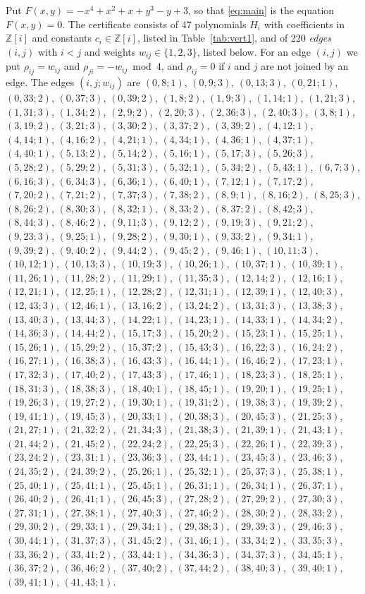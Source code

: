 \documentclass[11pt]{article}
\newcommand{\Z}{\mathbb{Z}}
\begin{document}
Put $F(x,y)=-x^{4}+x^{2}+x+y^{3}-y+3$, so that \eqref{eq:main} is the equation $F(x,y)=0$. The certificate consists of 47 polynomials $H_i$ with coefficients in $\Z[i]$ and constants $c_i\in\Z[i]$, listed in Table~\ref{tab:vert1}, and of 220 \emph{edges} $(i,j)$ with $i<j$ and weights $w_{ij}\in\{1,2,3\}$, listed below. For an edge $(i,j)$ we put $\rho_{ij}=w_{ij}$ and $\rho_{ji}=-w_{ij}\bmod 4$, and $\rho_{ij}=0$ if $i$ and $j$ are not joined by an edge.
The edges $(i,j;w_{ij})$ are $(0,8;1)$, $(0,9;3)$, $(0,13;3)$, $(0,21;1)$, $(0,33;2)$, $(0,37;3)$, $(0,39;2)$, $(1,8;2)$, $(1,9;3)$, $(1,14;1)$, $(1,21;3)$, $(1,31;3)$, $(1,34;2)$, $(2,9;2)$, $(2,20;3)$, $(2,36;3)$, $(2,40;3)$, $(3,8;1)$, $(3,19;2)$, $(3,21;3)$, $(3,30;2)$, $(3,37;2)$, $(3,39;2)$, $(4,12;1)$, $(4,14;1)$, $(4,16;2)$, $(4,21;1)$, $(4,34;1)$, $(4,36;1)$, $(4,37;1)$, $(4,40;1)$, $(5,13;2)$, $(5,14;2)$, $(5,16;1)$, $(5,17;3)$, $(5,26;3)$, $(5,28;2)$, $(5,29;2)$, $(5,31;3)$, $(5,32;1)$, $(5,34;2)$, $(5,43;1)$, $(6,7;3)$, $(6,16;3)$, $(6,34;3)$, $(6,36;1)$, $(6,40;1)$, $(7,12;1)$, $(7,17;2)$, $(7,20;2)$, $(7,21;2)$, $(7,37;3)$, $(7,38;2)$, $(8,9;1)$, $(8,16;2)$, $(8,25;3)$, $(8,26;2)$, $(8,30;3)$, $(8,32;1)$, $(8,33;2)$, $(8,37;2)$, $(8,42;3)$, $(8,44;3)$, $(8,46;2)$, $(9,11;3)$, $(9,12;2)$, $(9,19;3)$, $(9,21;2)$, $(9,23;3)$, $(9,25;1)$, $(9,28;2)$, $(9,30;1)$, $(9,33;2)$, $(9,34;1)$, $(9,39;2)$, $(9,40;2)$, $(9,44;2)$, $(9,45;2)$, $(9,46;1)$, $(10,11;3)$, $(10,12;1)$, $(10,13;3)$, $(10,19;3)$, $(10,26;1)$, $(10,37;1)$, $(10,39;1)$, $(11,26;1)$, $(11,28;2)$, $(11,29;1)$, $(11,35;3)$, $(12,14;2)$, $(12,16;1)$, $(12,21;1)$, $(12,25;1)$, $(12,28;2)$, $(12,31;1)$, $(12,39;1)$, $(12,40;3)$, $(12,43;3)$, $(12,46;1)$, $(13,16;2)$, $(13,24;2)$, $(13,31;3)$, $(13,38;3)$, $(13,40;3)$, $(13,44;3)$, $(14,22;1)$, $(14,23;1)$, $(14,33;1)$, $(14,34;2)$, $(14,36;3)$, $(14,44;2)$, $(15,17;3)$, $(15,20;2)$, $(15,23;1)$, $(15,25;1)$, $(15,26;1)$, $(15,29;2)$, $(15,37;2)$, $(15,43;3)$, $(16,22;3)$, $(16,24;2)$, $(16,27;1)$, $(16,38;3)$, $(16,43;3)$, $(16,44;1)$, $(16,46;2)$, $(17,23;1)$, $(17,32;3)$, $(17,40;2)$, $(17,43;3)$, $(17,46;1)$, $(18,23;3)$, $(18,25;1)$, $(18,31;3)$, $(18,38;3)$, $(18,40;1)$, $(18,45;1)$, $(19,20;1)$, $(19,25;1)$, $(19,26;3)$, $(19,27;2)$, $(19,30;1)$, $(19,31;2)$, $(19,38;3)$, $(19,39;2)$, $(19,41;1)$, $(19,45;3)$, $(20,33;1)$, $(20,38;3)$, $(20,45;3)$, $(21,25;3)$, $(21,27;1)$, $(21,32;2)$, $(21,34;3)$, $(21,38;3)$, $(21,39;1)$, $(21,43;1)$, $(21,44;2)$, $(21,45;2)$, $(22,24;2)$, $(22,25;3)$, $(22,26;1)$, $(22,39;3)$, $(23,24;2)$, $(23,31;1)$, $(23,36;3)$, $(23,44;1)$, $(23,45;3)$, $(23,46;3)$, $(24,35;2)$, $(24,39;2)$, $(25,26;1)$, $(25,32;1)$, $(25,37;3)$, $(25,38;1)$, $(25,40;1)$, $(25,41;1)$, $(25,45;1)$, $(26,31;1)$, $(26,34;1)$, $(26,37;1)$, $(26,40;2)$, $(26,41;1)$, $(26,45;3)$, $(27,28;2)$, $(27,29;2)$, $(27,30;3)$, $(27,31;1)$, $(27,38;1)$, $(27,40;3)$, $(27,46;2)$, $(28,30;2)$, $(28,33;2)$, $(29,30;2)$, $(29,33;1)$, $(29,34;1)$, $(29,38;3)$, $(29,39;3)$, $(29,46;3)$, $(30,44;1)$, $(31,37;3)$, $(31,45;2)$, $(31,46;1)$, $(33,34;2)$, $(33,35;3)$, $(33,36;2)$, $(33,41;2)$, $(33,44;1)$, $(34,36;3)$, $(34,37;3)$, $(34,45;1)$, $(36,37;2)$, $(36,46;2)$, $(37,40;2)$, $(37,44;2)$, $(38,40;3)$, $(39,40;1)$, $(39,41;1)$, $(41,43;1)$.
\end{document}
